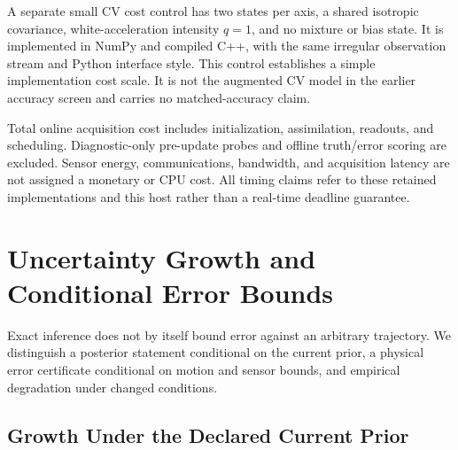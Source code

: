 \documentclass[journal]{IEEEtran}
\begin{document}
A separate small CV cost control has two states per axis, a shared
isotropic covariance, white-acceleration intensity $q=1$, and no mixture
or bias state. It is implemented in NumPy and compiled C++, with the same
irregular observation stream and Python interface style. This control
establishes a simple implementation cost scale. It is not the augmented
CV model in the earlier accuracy screen and carries no matched-accuracy
claim.

Total online acquisition cost includes initialization, assimilation,
readouts, and scheduling. Diagnostic-only pre-update probes and offline
truth/error scoring are excluded. Sensor energy, communications,
bandwidth, and acquisition latency are not assigned a monetary or CPU
cost. All timing claims refer to these retained implementations and this
host rather than a real-time deadline guarantee.

\section{Uncertainty Growth and Conditional Error Bounds}
\label{sec:bounds}

Exact inference does not by itself bound error against an arbitrary
trajectory. We distinguish a posterior statement conditional on the
current prior, a physical error certificate conditional on motion and
sensor bounds, and empirical degradation under changed conditions.

\subsection{Growth Under the Declared Current Prior}
\end{document}
